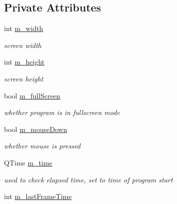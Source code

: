 \subsection*{Private Attributes}
\begin{DoxyCompactItemize}
\item 
\hypertarget{class_n_g_l_scene_a8d5dabddc30ca59d34088595bdd7d174}{int \hyperlink{class_n_g_l_scene_a8d5dabddc30ca59d34088595bdd7d174}{m\-\_\-width}}\label{class_n_g_l_scene_a8d5dabddc30ca59d34088595bdd7d174}

\begin{DoxyCompactList}\small\item\em screen width \end{DoxyCompactList}\item 
\hypertarget{class_n_g_l_scene_ad0fccff55fd9df6af9adda2c654de21d}{int \hyperlink{class_n_g_l_scene_ad0fccff55fd9df6af9adda2c654de21d}{m\-\_\-height}}\label{class_n_g_l_scene_ad0fccff55fd9df6af9adda2c654de21d}

\begin{DoxyCompactList}\small\item\em screen height \end{DoxyCompactList}\item 
\hypertarget{class_n_g_l_scene_a969d56f1bfb80598b0333107bb1fb60c}{bool \hyperlink{class_n_g_l_scene_a969d56f1bfb80598b0333107bb1fb60c}{m\-\_\-full\-Screen}}\label{class_n_g_l_scene_a969d56f1bfb80598b0333107bb1fb60c}

\begin{DoxyCompactList}\small\item\em whether program is in fullscreen mode \end{DoxyCompactList}\item 
\hypertarget{class_n_g_l_scene_ab5830b16af87f2843e8f41d212a6eb01}{bool \hyperlink{class_n_g_l_scene_ab5830b16af87f2843e8f41d212a6eb01}{m\-\_\-mouse\-Down}}\label{class_n_g_l_scene_ab5830b16af87f2843e8f41d212a6eb01}

\begin{DoxyCompactList}\small\item\em whether mouse is pressed \end{DoxyCompactList}\item 
\hypertarget{class_n_g_l_scene_a9de69b584317b729b6fd95d1bcc37f05}{Q\-Time \hyperlink{class_n_g_l_scene_a9de69b584317b729b6fd95d1bcc37f05}{m\-\_\-time}}\label{class_n_g_l_scene_a9de69b584317b729b6fd95d1bcc37f05}

\begin{DoxyCompactList}\small\item\em used to check elapsed time, set to time of program start \end{DoxyCompactList}\item 
\hypertarget{class_n_g_l_scene_a043c90078e0862126109544a5fe24b33}{int \hyperlink{class_n_g_l_scene_a043c90078e0862126109544a5fe24b33}{m\-\_\-last\-Frame\-Time}}\label{class_n_g_l_scene_a043c90078e0862126109544a5fe24b33}


\end{DoxyCompactItemize}
